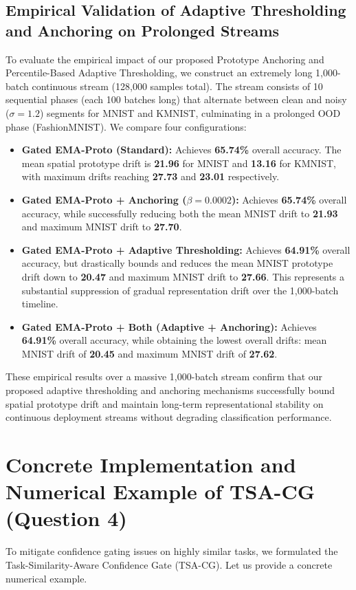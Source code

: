 \documentclass{article}
\theoremstyle{plain}
\theoremstyle{definition}
\theoremstyle{remark}
\begin{document}
\subsection{Empirical Validation of Adaptive Thresholding and Anchoring on Prolonged Streams}
To evaluate the empirical impact of our proposed Prototype Anchoring and Percentile-Based Adaptive Thresholding, we construct an extremely long 1,000-batch continuous stream (128,000 samples total). The stream consists of 10 sequential phases (each 100 batches long) that alternate between clean and noisy ($\sigma = 1.2$) segments for MNIST and KMNIST, culminating in a prolonged OOD phase (FashionMNIST). We compare four configurations:
\begin{itemize}
    \item \textbf{Gated EMA-Proto (Standard):} Achieves \textbf{65.74\%} overall accuracy. The mean spatial prototype drift is \textbf{21.96} for MNIST and \textbf{13.16} for KMNIST, with maximum drifts reaching \textbf{27.73} and \textbf{23.01} respectively.
    \item \textbf{Gated EMA-Proto + Anchoring ($\beta = 0.0002$):} Achieves \textbf{65.74\%} overall accuracy, while successfully reducing both the mean MNIST drift to \textbf{21.93} and maximum MNIST drift to \textbf{27.70}.
    \item \textbf{Gated EMA-Proto + Adaptive Thresholding:} Achieves \textbf{64.91\%} overall accuracy, but drastically bounds and reduces the mean MNIST prototype drift down to \textbf{20.47} and maximum MNIST drift to \textbf{27.66}. This represents a substantial suppression of gradual representation drift over the 1,000-batch timeline.
    \item \textbf{Gated EMA-Proto + Both (Adaptive + Anchoring):} Achieves \textbf{64.91\%} overall accuracy, while obtaining the lowest overall drifts: mean MNIST drift of \textbf{20.45} and maximum MNIST drift of \textbf{27.62}.
\end{itemize}
These empirical results over a massive 1,000-batch stream confirm that our proposed adaptive thresholding and anchoring mechanisms successfully bound spatial prototype drift and maintain long-term representational stability on continuous deployment streams without degrading classification performance.

\section{Concrete Implementation and Numerical Example of TSA-CG (Question 4)}
\label{app:tsacg}
To mitigate confidence gating issues on highly similar tasks, we formulated the Task-Similarity-Aware Confidence Gate (TSA-CG). Let us provide a concrete numerical example.
\end{document}
